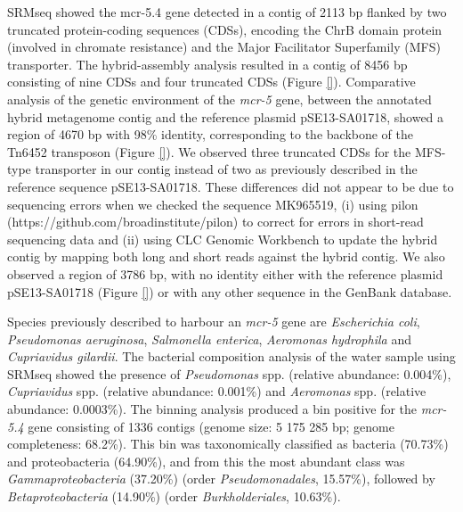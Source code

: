 SRMseq showed the mcr-5.4 gene detected in a contig of 2113 bp flanked by two truncated protein-coding sequences (CDSs), encoding the ChrB domain protein (involved in chromate resistance) and the Major Facilitator Superfamily (MFS) transporter.
The hybrid-assembly analysis resulted in a contig of 8456 bp consisting of nine CDSs and four truncated CDSs (Figure \ref{}).
Comparative analysis of the genetic environment of the \textit{mcr-5} gene, between the annotated hybrid metagenome contig and the reference plasmid pSE13-SA01718, showed a region of 4670 bp with 98\% identity, corresponding to the backbone of the Tn6452 transposon (Figure \ref{}). 
We observed three truncated CDSs for the MFS-type transporter in our contig instead of two as previously described in the reference sequence pSE13-SA01718. 
These differences did not appear to be due to sequencing errors when we checked the sequence MK965519, (i) using pilon (https://github.com/broadinstitute/pilon) to correct for errors in short-read sequencing data and (ii) using CLC Genomic Workbench to update the hybrid contig by mapping both long and short reads against the hybrid contig.
We also observed a region of 3786 bp, with no identity either with the reference plasmid pSE13-SA01718 (Figure \ref{}) or with any other sequence in the GenBank database.

Species previously described to harbour an \textit{mcr-5} gene are \textit{Escherichia coli}, \textit{Pseudomonas aeruginosa}, \textit{Salmonella enterica}, \textit{Aeromonas hydrophila} and \textit{Cupriavidus gilardii}. 
The bacterial composition analysis of the water sample using SRMseq showed the presence of \textit{Pseudomonas} spp. (relative abundance: 0.004\%), \textit{Cupriavidus} spp. (relative abundance: 0.001\%) and \textit{Aeromonas} spp. (relative abundance: 0.0003\%). 
The binning analysis produced a bin positive for the \textit{mcr-5.4} gene consisting of 1336 contigs (genome size: 5 175 285 bp; genome completeness: 68.2\%). 
This bin was taxonomically classified as bacteria (70.73\%) and proteobacteria (64.90\%), and from this the most abundant class was \textit{Gammaproteobacteria} (37.20\%) (order \textit{Pseudomonadales}, 15.57\%), followed by \textit{Betaproteobacteria} (14.90\%) (order \textit{Burkholderiales}, 10.63\%).

